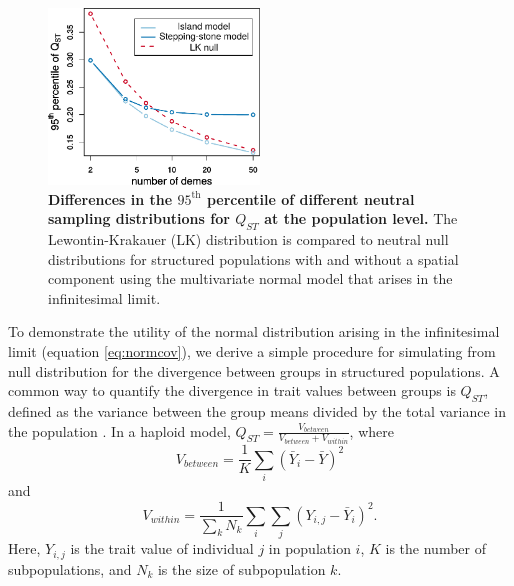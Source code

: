 \begin{figure}
  \centering
  \includegraphics[width=0.5\textwidth]{./figures/qst_deme_percentile_nospace_alt.pdf}
  \caption{\textbf{Differences in the $95^{\mathrm{th}}$ percentile of different
      neutral sampling distributions for $Q_{ST}$ at the population level.} The
    Lewontin-Krakauer (LK) distribution is compared to neutral null
    distributions for structured populations with and without a spatial
    component using the multivariate normal model that arises in the
    infinitesimal limit.}
  \label{fig:qst_perc}
\end{figure}


To demonstrate the utility of the normal distribution arising in the
infinitesimal limit (equation \ref{eq:normcov}), we derive a simple procedure
for simulating from null distribution for the divergence between groups in
structured populations. A common way to quantify the divergence in trait values
between groups is $Q_{ST}$, defined as the variance between the group means
divided by the total variance in the population \citep{Spitze1993}. In a haploid
model, $Q_{ST} = \frac{V_{between}}{V_{between} + V_{within}}$, where
\begin{equation*}
  V_{between} = \frac{1}{K} \sum_i \left( \bar{Y}_i - \bar{Y} \right)^2
\end{equation*}
and
\begin{equation*}
  V_{within} = \frac{1}{\sum_k N_k} \sum_i \sum_j \left( Y_{i,j} - \bar{Y}_i \right)^2.
\end{equation*}
Here, $Y_{i,j}$ is the trait value of individual $j$ in population $i$, $K$ is
the number of subpopulations, and $N_k$ is the size of subpopulation $k$.

